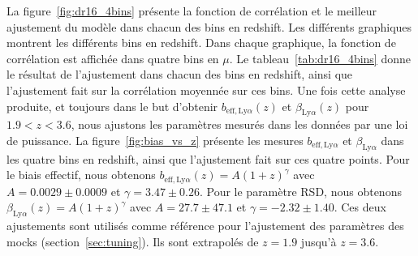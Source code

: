 La figure~\ref{fig:dr16_4bins} présente la fonction de corrélation et le meilleur ajustement du modèle dans chacun des bins en redshift. Les différents graphiques montrent les différents bins en redshift. Dans chaque graphique, la fonction de corrélation est affichée dans quatre bins en $\mu$. Le tableau~\ref{tab:dr16_4bins} donne le résultat de l'ajustement dans chacun des bins en redshift, ainsi que l'ajustement fait sur la corrélation moyennée sur ces bins.
Une fois cette analyse produite, et toujours dans le but d'obtenir $b_{\mathrm{eff},\mathrm{Ly}\alpha}(z)$ et $\beta_{\mathrm{Ly}\alpha}(z)$ pour $\num{1.9} < z  < \num{3.6}$, nous ajustons les paramètres \lya{} mesurés dans les données par une loi de puissance. La figure~\ref{fig:bias_vs_z} présente les mesures $b_{\mathrm{eff},\mathrm{Ly}\alpha}$ et $\beta_{\mathrm{Ly}\alpha}$ dans les quatre bins en redshift, ainsi que l'ajustement fait sur ces quatre points.
Pour le biais effectif, nous obtenons $b_{\mathrm{eff},\mathrm{Ly}\alpha}(z) = A (1+z)^{\gamma}$ avec $A = \num{0.0029} \pm \num{0.0009}$ et $\gamma = \num{3.47} \pm \num{0.26}$.
Pour le paramètre RSD, nous obtenons $\beta_{\mathrm{Ly}\alpha}(z) = A (1+z)^{\gamma}$ avec $A = \num{27.7} \pm \num{47.1}$ et $\gamma = - \num{2.32} \pm \num{1.40}$.
Ces deux ajustements sont utilisés comme référence pour l'ajustement des paramètres des mocks (section~\ref{sec:tuning}). Ils sont extrapolés de $z = \num{1.9}$ jusqu'à $z = \num{3.6}$.


